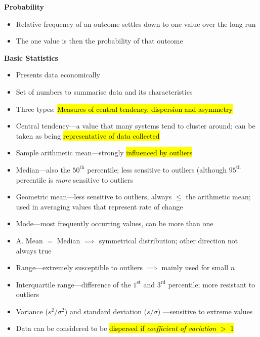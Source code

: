 \documentclass{article}
\newcommand{\headingsmall}[1]{{\small\textbf{#1}}}
\begin{document}
\begin{multicols*}{4}
\headingsmall{Probability}
\begin{itemize} \itemsep -0.5em
    \item Relative frequency of an outcome settles down to one value over the long run
    \item The one value is then the probability of that outcome
\end{itemize}

\headingsmall{Basic Statistics}
\begin{itemize} \itemsep -0.5em
    \item Presents data economically
    \item Set of numbers to summarise data and its characteristics
    \item Three types: \hl{Measures of central tendency, dispersion
        and asymmetry}
    \item Central tendency---a value that many systems tend to cluster
        around; can be taken as being \hl{representative of data collected}
    \item Sample arithmetic mean---strongly \hl{influenced by outliers}
    \item Median---also the $50^{\mathrm{th}}$ percentile; less sensitive
         to outliers (although $95^{\mathrm{th}}$ percentile is 
        \textit{more} sensitive to outliers
    \item Geometric mean---less sensitive to outliers, always $\leq$ the
        arithmetic mean; used in averaging values that represent 
        rate of change
    \item Mode---most frequently occurring values, can be more than one
    \item A. Mean $=$ Median $\implies$ symmetrical distribution; other
        direction not always true
    \item Range---extremely susceptible to outliers $\implies$ mainly
        used for small $n$
    \item Interquartile range---difference of the $1^\mathrm{st}$ and
        $3^\mathrm{rd}$ percentile; more resistant to outliers
    \item Variance ($s^2/\sigma^2$) and standard deviation ($s/\sigma$)
        ---sensitive to extreme values
    \item Data can be considered to be \hl{dispersed if \textit{coefficient of 
        variation} $>$ 1}
\end{itemize}


\end{multicols*}
\end{document}
